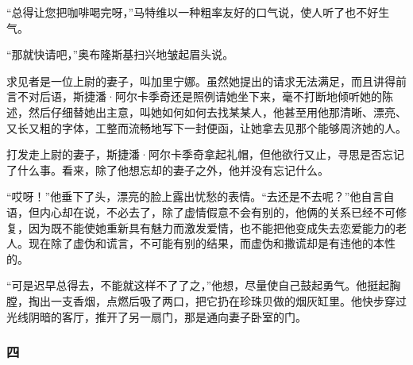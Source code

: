 \par “总得让您把咖啡喝完呀，”马特维以一种粗率友好的口气说，使人听了也不好生气。
\par “那就快请吧，”奥布隆斯基扫兴地皱起眉头说。
\par 求见者是一位上尉的妻子，叫加里宁娜。虽然她提出的请求无法满足，而且讲得前言不对后语，斯捷潘·阿尔卡季奇还是照例请她坐下来，毫不打断地倾听她的陈述，然后仔细替她出主意，叫她如何如何去找某某人，他甚至用他那清晰、漂亮、又长又粗的字体，工整而流畅地写下一封便函，让她拿去见那个能够周济她的人。
\par 打发走上尉的妻子，斯捷潘·阿尔卡季奇拿起礼帽，但他欲行又止，寻思是否忘记了什么事。看来，除了他想忘却的妻子之外，他并没有忘记什么。
\par “哎呀！”他垂下了头，漂亮的脸上露出忧愁的表情。“去还是不去呢？”他自言自语，但内心却在说，不必去了，除了虚情假意不会有别的，他俩的关系已经不可修复，因为既不能使她重新具有魅力而激发爱情，也不能把他变成失去恋爱能力的老人。现在除了虚伪和谎言，不可能有别的结果，而虚伪和撒谎却是有违他的本性的。
\par “可是迟早总得去，不能就这样不了了之，”他想，尽量使自己鼓起勇气。他挺起胸膛，掏出一支香烟，点燃后吸了两口，把它扔在珍珠贝做的烟灰缸里。他快步穿过光线阴暗的客厅，推开了另一扇门，那是通向妻子卧室的门。

\subsubsection*{四}

